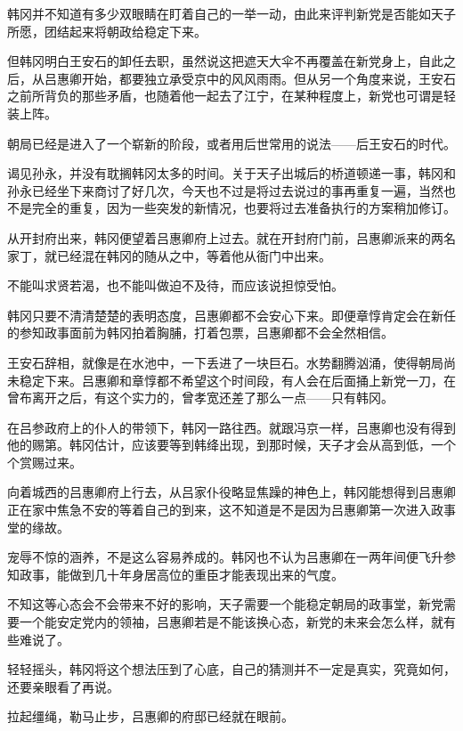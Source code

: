 韩冈并不知道有多少双眼睛在盯着自己的一举一动，由此来评判新党是否能如天子所愿，团结起来将朝政给稳定下来。

但韩冈明白王安石的卸任去职，虽然说这把遮天大伞不再覆盖在新党身上，自此之后，从吕惠卿开始，都要独立承受京中的风风雨雨。但从另一个角度来说，王安石之前所背负的那些矛盾，也随着他一起去了江宁，在某种程度上，新党也可谓是轻装上阵。

朝局已经是进入了一个崭新的阶段，或者用后世常用的说法——后王安石的时代。

谒见孙永，并没有耽搁韩冈太多的时间。关于天子出城后的桥道顿递一事，韩冈和孙永已经坐下来商讨了好几次，今天也不过是将过去说过的事再重复一遍，当然也不是完全的重复，因为一些突发的新情况，也要将过去准备执行的方案稍加修订。

从开封府出来，韩冈便望着吕惠卿府上过去。就在开封府门前，吕惠卿派来的两名家丁，就已经混在韩冈的随从之中，等着他从衙门中出来。

不能叫求贤若渴，也不能叫做迫不及待，而应该说担惊受怕。

韩冈只要不清清楚楚的表明态度，吕惠卿都不会安心下来。即便章惇肯定会在新任的参知政事面前为韩冈拍着胸脯，打着包票，吕惠卿都不会全然相信。

王安石辞相，就像是在水池中，一下丢进了一块巨石。水势翻腾汹涌，使得朝局尚未稳定下来。吕惠卿和章惇都不希望这个时间段，有人会在后面捅上新党一刀，在曾布离开之后，有这个实力的，曾孝宽还差了那么一点——只有韩冈。

在吕参政府上的仆人的带领下，韩冈一路往西。就跟冯京一样，吕惠卿也没有得到他的赐第。韩冈估计，应该要等到韩绛出现，到那时候，天子才会从高到低，一个个赏赐过来。

向着城西的吕惠卿府上行去，从吕家仆役略显焦躁的神色上，韩冈能想得到吕惠卿正在家中焦急不安的等着自己的到来，这不知道是不是因为吕惠卿第一次进入政事堂的缘故。

宠辱不惊的涵养，不是这么容易养成的。韩冈也不认为吕惠卿在一两年间便飞升参知政事，能做到几十年身居高位的重臣才能表现出来的气度。

不知这等心态会不会带来不好的影响，天子需要一个能稳定朝局的政事堂，新党需要一个能安定党内的领袖，吕惠卿若是不能该换心态，新党的未来会怎么样，就有些难说了。

轻轻摇头，韩冈将这个想法压到了心底，自己的猜测并不一定是真实，究竟如何，还要亲眼看了再说。

拉起缰绳，勒马止步，吕惠卿的府邸已经就在眼前。

